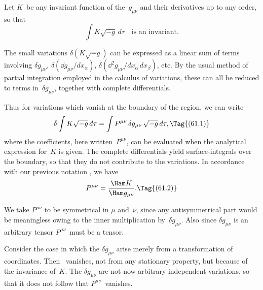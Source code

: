 \documentclass[12pt]{book}
\begin{document}

Let $K$~be any invariant function of the~$g_{\mu\nu}$ and their derivatives up to any
order, so that
\[
\int K \sqrt{-g}\, d\tau\quad\text{is an invariant.}
\]

The small variations $\delta(K \sqrt{-g})$ can be expressed as a linear sum of terms
involving $\delta g_{\mu\nu}$, $\delta(\dd g_{\mu\nu}/dx_{\alpha})$, $\delta(\dd^{2} g_{\mu\nu}/dx_{\alpha}\, dx_{\beta})$, etc. By the usual method of partial
integration employed in the calculus of variations, these can all be reduced to
terms in~$\delta g_{\mu\nu}$, together with complete differentials.

Thus for variations which vanish at the boundary of the region, we can
write
\[
\delta \int K \sqrt{-g}\, d\tau
= \int P^{\mu\nu}\, \delta g_{\mu\nu}\, \sqrt{-g}\, d\tau,
\Tag{(61.1)}
\]
where the coefficients, here written~$P^{\mu\nu}$, can be evaluated when the analytical
expression for~$K$ is given. The complete differentials yield surface-integrals
over the boundary, so that they do not contribute to the variations. In
accordance with our previous notation , we have
\[
P^{\mu\nu} = \frac{\Ham K}{\Ham g_{\mu\nu}}.
\Tag{(61.2)}
\]

We take $P^{\mu\nu}$ to be symmetrical in $\mu$ and~$\nu$, since any antisymmetrical part
would be meaningless owing to the inner multiplication by~$\delta g_{\mu\nu}$. Also since
$\delta g_{\mu\nu}$ is an arbitrary tensor $P^{\mu\nu}$~must be a tensor.

Consider the case in which the $\delta g_{\mu\nu}$ arise merely from a transformation of
coordinates. Then ~vanishes, not from any stationary property, but
because of the invariance of~$K$. The $\delta g_{\mu\nu}$ are not now arbitrary independent
variations, so that it does not follow that $P^{\mu\nu}$~vanishes.
\end{document}
